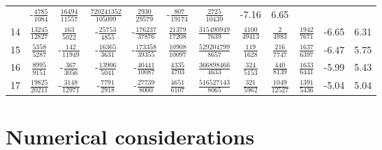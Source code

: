 \documentclass[letterpaper,11pt,nointlimits,reqno,draft]{amsbook}
\begin{document}
\begin{table}
\begin{tabular}{r|ccccccccc|c@{ -- }c@{\%}}
& -$\frac{            4785}{            1084}$
&  $\frac{           16494}{           11557}$
&  $\frac{       720241352}{          105099}$
&  $\frac{            2930}{           29579}$
& -$\frac{             807}{           19174}$
&  $\frac{            2725}{           10439}$
&  -7.16 &  6.65
\\
14
&  $\frac{           13245}{           12827}$
&  $\frac{             163}{            5022}$
& -$\frac{           25753}{            4855}$
& -$\frac{          176237}{           37876}$
&  $\frac{           21379}{           17208}$
&  $\frac{       315490949}{            7639}$
&  $\frac{            4100}{           49413}$
&  $\frac{               2}{            4983}$
&  $\frac{            1942}{            7671}$
&  -6.65 &  6.31
\\
15
&  $\frac{            5358}{            5287}$
& -$\frac{             142}{           11949}$
& -$\frac{           16365}{            3631}$
& -$\frac{          173358}{           39355}$
&  $\frac{           10908}{           10097}$
&  $\frac{       529204799}{            8657}$
&  $\frac{             119}{            1628}$
&  $\frac{             216}{            7747}$
&  $\frac{            1637}{            6397}$
&  -6.47 &  5.75
\\
16
&  $\frac{            8995}{            9151}$
& -$\frac{             367}{            3056}$
& -$\frac{           13906}{            5041}$
& -$\frac{           40441}{           10087}$
&  $\frac{            4335}{            4703}$
&  $\frac{       366898466}{            4633}$
&  $\frac{             324}{            5153}$
&  $\frac{             440}{            8139}$
&  $\frac{            1633}{            6441}$
&  -5.99 &  5.43
\\
17
&  $\frac{           19825}{           20211}$
& -$\frac{            3148}{           12971}$
& -$\frac{            7791}{            2918}$
& -$\frac{           27739}{            8000}$
&  $\frac{            4651}{            6107}$
&  $\frac{       516527143}{            8065}$
&  $\frac{             321}{            5962}$
&  $\frac{            1049}{           12527}$
&  $\frac{            1391}{            5436}$
&  -5.04 &  5.04
\\ \hline
\end{tabular}
\end{table}

\chapter{Numerical considerations}
\end{document}
